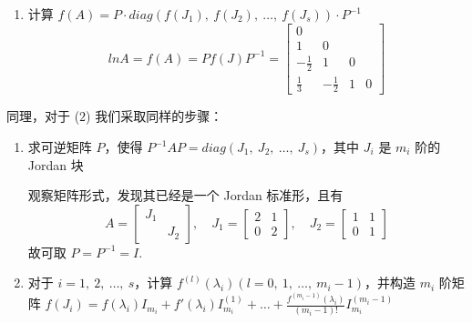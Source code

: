 \begin{solution}
\begin{enumerate}
                    \item 计算 $f(A) = P \cdot diag(f(J_1), \ f(J_2), \ \dots, \ f(J_s)) \cdot P^{-1}$
                        \begin{equation*}
                            lnA = f(A) = Pf(J)P^{-1} = \begin{bmatrix}
                                0 & & & \\ 1 & 0 & & \\ -\frac{1}{2} & 1 & 0 & \\ \frac{1}{3} & -\frac{1}{2} & 1 & 0 
                            \end{bmatrix}
                        \end{equation*}
                    \end{enumerate}
                    \par 同理，对于 ($2$) 我们采取同样的步骤：
                    \begin{enumerate}
                        \item 求可逆矩阵 $P$，使得 $P^{-1}AP = diag(J_1, \ J_2, \ \dots, \ J_s)$，其中 $J_i$ 是 $m_i$ 阶的 Jordan 块 
                           \par 观察矩阵形式，发现其已经是一个 Jordan 标准形，且有
                           \begin{equation*}
                                A = \begin{bmatrix}
                                    J_1 & \\ & J_2 
                                \end{bmatrix}, \quad J_1 = \begin{bmatrix}
                                    2 & 1 \\ 0 & 2
                                \end{bmatrix}, \quad J_2 = \begin{bmatrix}
                                    1 & 1 \\ 0 & 1
                                \end{bmatrix}
                           \end{equation*}
                           故可取 $P = P^{-1} = I$.
                        \item 对于 $i = 1, \ 2, \ \dots, \ s$，计算 $f^{(l)}(\lambda_i)(l = 0, \ 1, \ \dots, \ m_i - 1)$，并构造 $m_i$ 阶矩阵 $f(J_i) = f(\lambda_i)I_{m_i} + f'(\lambda_i)I_{m_i}^{(1)} + \dots + \frac{f^{(m_i-1)}(\lambda_i)}{(m_i - 1)!}I_{m_i}^{(m_i-1)}$
                            \begin{align*}

\end{align*}
\end{enumerate}
\end{solution}
